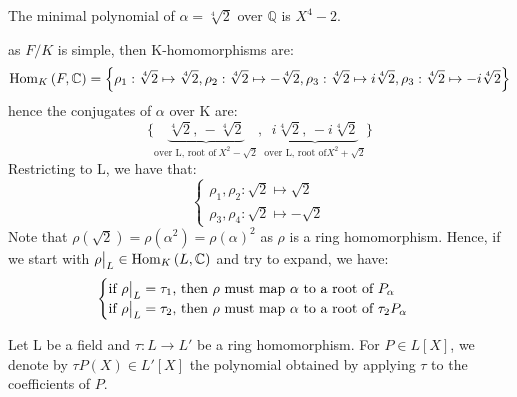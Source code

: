 The minimal polynomial of $\alpha = \sqrt[4]{2}$ over $\mathbb{Q}$ is $X^4-2$.
\begin{figure}[H]
  \centering
\end{figure}
as $F/K$ is simple, then K-homomorphisms are:
\begin{equation*}
  \text{Hom}_{K}\left(F, \mathbb{C}\right) = \left\{ \rho_1 : \sqrt[4]{2} \mapsto \sqrt[4]{2}, \rho_2 : \sqrt[4]{2} \mapsto -\sqrt[4]{2}, \rho_3 : \sqrt[4]{2} \mapsto i\sqrt[4]{2}, \rho_3 : \sqrt[4]{2} \mapsto -i\sqrt[4]{2}\right\} 
\end{equation*}
hence the conjugates of $\alpha$ over K are:
\begin{equation*}
  \{\underbrace{\sqrt[4]{2},\, -\sqrt[4]{2}}_{\text{over L, root of} \ X^2-\sqrt{2}}, \underbrace{i\sqrt[4]{2},\, -i\sqrt[4]{2}}_{\text{over L, root of} X^2+\sqrt{2}}\}
\end{equation*}
Restricting to L, we have that:
\begin{equation*}
  \begin{cases}
    \rho_1, \rho_2 : \sqrt{2}  \mapsto  \sqrt{2} \\
    \rho_3, \rho_4 : \sqrt{2}  \mapsto  -\sqrt{2}
  \end{cases}
\end{equation*}
Note that $\rho(\sqrt{2}) = \rho(\alpha^2) = \rho(\alpha)^2$ as $\rho$ is a ring homomorphism. Hence, if we start with $\restr{\rho}{L} \in \homset{L}{\mathbb{C}}$ and try to expand, we have:
\begin{equation*}
  \begin{cases}
    \text{if $\restr{\rho}{L} = \tau_1$, then $\rho$ must map $\alpha$ to a root of $P_\alpha$} \\
    \text{if $\restr{\rho}{L} = \tau_2$, then $\rho$ must map $\alpha$ to a root of $\tau_2P_\alpha$}
  \end{cases}
\end{equation*}

\begin{definition}\label{def:16}
  Let L be a field and $\tau : L \rightarrow L'$ be a ring homomorphism. For $P \in L[X]$, we denote by $\tau{}P(X) \in L'[X]$ the polynomial obtained by applying $\tau$ to the coefficients of $P$.
\end{definition}

